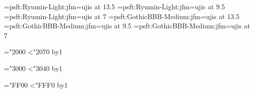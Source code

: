 
\jfont\tenmin=psft:Ryumin-Light:jfm=ujis at 13.5\jQ
\jfont\sevenmin=psft:Ryumin-Light:jfm=ujis at 9.5\jQ
\jfont\fivemin=psft:Ryumin-Light:jfm=ujis at 7\jQ
\jfont\tengt=psft:GothicBBB-Medium:jfm=ujis at 13.5\jQ
\jfont\sevengt=psft:GothicBBB-Medium:jfm=ujis at 9.5\jQ
\jfont\fivegt=psft:GothicBBB-Medium:jfm=ujis at 7\jQ

\let\mc=\tenmin
\let\gt=\tengt
\mc
{}



\ltj@tempcnta="2000%
\loop\ifnum\ltj@tempcnta<"2070%
  \advance\ltj@tempcnta by1
\repeat

\ltj@tempcnta="3000%
\loop\ifnum\ltj@tempcnta<"3040%
  \advance\ltj@tempcnta by1
\repeat

\ltj@tempcnta="FF00%
\loop\ifnum\ltj@tempcnta<"FFF0%
  \advance\ltj@tempcnta by1
\repeat
\endinput